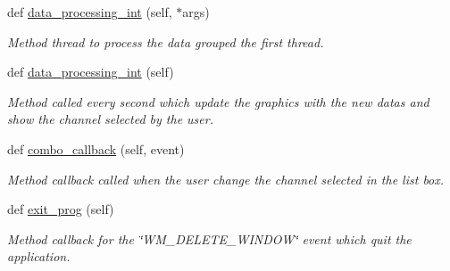 \begin{DoxyCompactItemize}
def \mbox{\hyperlink{classreceive_1_1_watchman__graphic__window_acb7c1aaa438d82608be5913143f2b60c}{data\+\_\+processing\+\_\+int}} (self, $\ast$args)
\begin{DoxyCompactList}\small\item\em Method thread to process the data grouped the first thread. \end{DoxyCompactList}\item 
def \mbox{\hyperlink{classreceive_1_1_watchman__graphic__window_a1cac17a5de3d4dcb676ba2e6ca93e14a}{data\+\_\+processing\+\_\+int}} (self)
\begin{DoxyCompactList}\small\item\em Method called every second which update the graphics with the new datas and show the channel selected by the user. \end{DoxyCompactList}\item 
def \mbox{\hyperlink{classreceive_1_1_watchman__graphic__window_ad9b67ca0a3b3f09f9e19459e62952eea}{combo\+\_\+callback}} (self, event)
\begin{DoxyCompactList}\small\item\em Method callback called when the user change the channel selected in the list box. \end{DoxyCompactList}\item 
def \mbox{\hyperlink{classreceive_1_1_watchman__graphic__window_a22cace25ba6be74a865cabbde2b0de65}{exit\+\_\+prog}} (self)
\begin{DoxyCompactList}\small\item\em Method callback for the \char`\"{}\+W\+M\+\_\+\+D\+E\+L\+E\+T\+E\+\_\+\+W\+I\+N\+D\+O\+W\char`\"{} event which quit the application. \end{DoxyCompactList}\end{DoxyCompactItemize}
